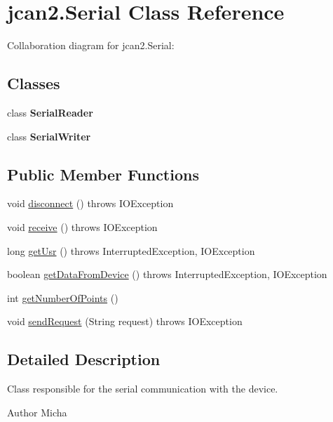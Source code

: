 \hypertarget{classjcan2_1_1_serial}{}\section{jcan2.\+Serial Class Reference}
\label{classjcan2_1_1_serial}


Collaboration diagram for jcan2.\+Serial\+:
\subsection*{Classes}
\begin{DoxyCompactItemize}
\item 
class {\bfseries Serial\+Reader}
\item 
class {\bfseries Serial\+Writer}
\end{DoxyCompactItemize}
\subsection*{Public Member Functions}
\begin{DoxyCompactItemize}
\item 
void \hyperlink{classjcan2_1_1_serial_a7482488cbc741ce5bed5ab36aca007c8}{disconnect} ()  throws I\+O\+Exception 
\item 
void \hyperlink{classjcan2_1_1_serial_a0a722f879ab7a55ccafcf5c4961e20f3}{receive} ()  throws I\+O\+Exception
\item 
long \hyperlink{classjcan2_1_1_serial_af5fc1fe3bbd70f909545ce3434dca503}{get\+Usr} ()  throws Interrupted\+Exception, I\+O\+Exception
\item 
boolean \hyperlink{classjcan2_1_1_serial_ac148e30d986f78e80022c5f627045896}{get\+Data\+From\+Device} ()  throws Interrupted\+Exception, I\+O\+Exception
\item 
int \hyperlink{classjcan2_1_1_serial_ac225ddb960cfdf0a36b809b850fa9ec6}{get\+Number\+Of\+Points} ()
\item 
void \hyperlink{classjcan2_1_1_serial_a78875185887b795449551af87b0cd30c}{send\+Request} (String request)  throws I\+O\+Exception
\end{DoxyCompactItemize}


\subsection{Detailed Description}
Class responsible for the serial communication with the device. \begin{DoxyAuthor}{Author}
Micha 
\end{DoxyAuthor}


